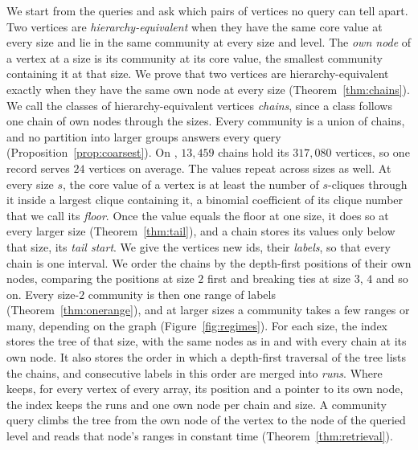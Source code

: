 We start from the queries and ask which pairs of vertices no query can tell apart.
%
Two vertices are \emph{hierarchy-equivalent} when they have the same core value at every size and lie in the same community at every size and level.
%
The \emph{own node} of a vertex at a size is its community at its core value, the smallest community containing it at that size.
%
We prove that two vertices are hierarchy-equivalent exactly when they have the same own node at every size (Theorem~\ref{thm:chains}).
%
We call the classes of hierarchy-equivalent vertices \emph{chains}, since a class follows one chain of own nodes through the sizes.
%
Every community is a union of chains, and no partition into larger groups answers every query (Proposition~\ref{prop:coarsest}).
%
On \dblp, $13{,}459$ chains hold its $317{,}080$ vertices, so one record serves $24$ vertices on average.
%
The values repeat across sizes as well.
%
At every size $s$, the core value of a vertex is at least the number of $s$-cliques through it inside a largest clique containing it, a binomial coefficient of its clique number that we call its \emph{floor}.
%
Once the value equals the floor at one size, it does so at every larger size (Theorem~\ref{thm:tail}), and a chain stores its values only below that size, its \emph{tail start}.
%
We give the vertices new ids, their \emph{labels}, so that every chain is one interval.
%
We order the chains by the depth-first positions of their own nodes, comparing the positions at size $2$ first and breaking ties at size $3$, $4$ and so on.
%
Every size-$2$ community is then one range of labels (Theorem~\ref{thm:onerange}), and at larger sizes a community takes a few ranges or many, depending on the graph (Figure~\ref{fig:regimes}).
%
For each size, the index stores the tree of that size, with the same nodes as in \strees and with every chain at its own node.
%
It also stores the order in which a depth-first traversal of the tree lists the chains, and consecutive labels in this order are merged into \emph{runs}.
%
Where \strees keeps, for every vertex of every array, its position and a pointer to its own node, the index keeps the runs and one own node per chain and size.
%
A community query climbs the tree from the own node of the vertex to the node of the queried level and reads that node's ranges in constant time (Theorem~\ref{thm:retrieval}).

